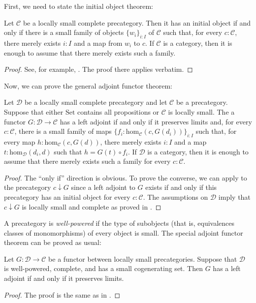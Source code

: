 \documentclass[reqno]{amsart}
\theoremstyle{definition}
\theoremstyle{remark}
\newcommand{\fs}[1]{\mathrm{#1}}
\newcommand{\scat}[1]{\mathcal{#1}}
\renewcommand{\hom}{\fs{hom}}
\newcommand{\uSet}{\fs{Set}}
\numberwithin{figure}{section}
\begin{document}
First, we need to state the initial object theorem:

\begin{lem}[initial]
Let $\scat{C}$ be a locally small complete precategory.
Then it has an initial object if and only if there is a small family of objects $\{ w_i \}_{i : I}$ of $\scat{C}$ such that, for every $c : \scat{C}$, there merely exists $i : I$ and a map from $w_i$ to $c$.
If $\scat{C}$ is a category, then it is enough to assume that there merely exists such a family.
\end{lem}
\begin{proof}
See, for example, \cite[Theorem~V.6.1]{maclane}.
The proof there applies verbatim.
\end{proof}

Now, we can prove the general adjoint functor theorem:

\begin{thm}
Let $\scat{D}$ be a locally small complete precategory and let $\scat{C}$ be a precategory.
Suppose that either $\uSet$ contains all propositions or $\scat{C}$ is locally small.
The a functor $G : \scat{D} \to \scat{C}$ has a left adjoint if and only if it preserves limits and, for every $c : \scat{C}$, there is a small family of maps $\{ f_i : \hom_\scat{C}(c,G(d_i)) \}_{i : I}$
such that, for every map $h : \hom_\scat{C}(c,G(d))$, there merely exists $i : I$ and a map $t : \hom_\scat{D}(d_i,d)$ such that $h = G(t) \circ f_i$.
If $\scat{D}$ is a category, then it is enough to assume that there merely exists such a family for every $c : \scat{C}$.
\end{thm}
\begin{proof}
The ``only if'' direction is obvious.
To prove the converse, we can apply  to the precategory $c \downarrow G$ since a left adjoint to $G$ exists if and only if this precategory has an initial object for every $c : \scat{C}$.
The assumptions on $\scat{D}$ imply that $c \downarrow G$ is locally small and complete as proved in \cite[Theorem~V.6.2]{maclane}.
\end{proof}

A precategory is \emph{well-powered} if the type of subobjects (that is, equivalences classes of monomorphisms) of every object is small.
The special adjoint functor theorem can be proved as usual:

\begin{thm}
Let $G : \scat{D} \to \scat{C}$ be a functor between locally small precategories.
Suppose that $\scat{D}$ is well-powered, complete, and has a small cogenerating set.
Then $G$ has a left adjoint if and only if it preserves limits.
\end{thm}
\begin{proof}
The proof is the same as in \cite[Theorem~V.8.2]{maclane}.
\end{proof}



\end{document}
